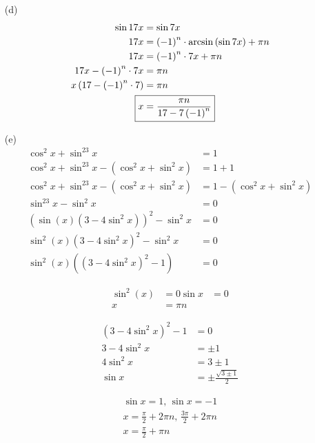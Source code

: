 \documentclass{article}
\begin{document}
\begin{itemize}
\item[(d)]
	\begin{align*}
		\sin17x&=\sin7x \\
		17x&=\left(-1\right)^n\cdot\arcsin\left(\sin7x\right)
			+\pi n \\
		17x&=\left(-1\right)^n\cdot7x+\pi n \\
		17x-\left(-1\right)^n\cdot7x&=\pi n \\
		x\left(17-\left(-1\right)^n\cdot7\right)&=\pi n \\
		\Aboxed{x&=\frac{\pi n}{17-7\left(-1\right)^n}}
	\end{align*}

\item[(e)]
	\begin{align*}
		\cos^2x+\sin^23x&=1 \\
		\cos^2x+\sin^23x-\left(\cos^2x+\sin^2x\right)&=1+1 \\
		\cos^2x+\sin^23x-\left(\cos^2x+\sin^2x\right)
			&=1-\left(\cos^2x+\sin^2x\right) \\
		\sin^23x-\sin^2x&=0 \\
		\left(\sin\left(x\right)\left(3-4\sin^2x\right)
			\right)^2-\sin^2x&=0 \\
		\sin^2\left(x\right)\left(3-4\sin^2x\right)^2-
			\sin^2x&=0 \\
		\sin^2\left(x\right)\left(\left(3-4\sin^2x\right)^2
			-1\right)&=0
	\end{align*}
	\begin{minipage}[t]{.3\textwidth}
		\begin{align*}
			\sin^2\left(x\right)&=0
			\sin x&=0 \\
			x&=\pi n
		\end{align*}
	\end{minipage}
	\begin{minipage}[t]{.7\textwidth}
		\begin{align*}
			\left(3-4\sin^2x\right)^2-1&=0 \\
			3-4\sin^2x&=\pm1 \\
			4\sin^2x&=3\pm1 \\
			\sin x&=\pm\frac{\sqrt{3\pm1}}{2}
		\end{align*}
	\end{minipage}
	\begin{minipage}[t]{.33\textwidth}
		\begin{gather*}
			\sin x=1,\,\sin x=-1 \\
			x=\frac{\pi}{2}+2\pi n,\,\frac{3\pi}{2}+2\pi n \\
			x=\frac{\pi}{2}+\pi n

\end{gather*}
\end{minipage}
\end{itemize}
\end{document}
